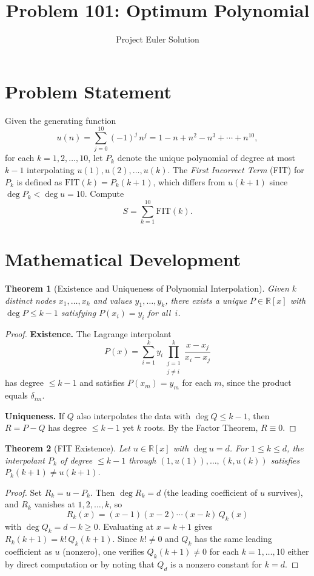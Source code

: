 \documentclass[12pt]{article}
\title{Problem 101: Optimum Polynomial}
\author{Project Euler Solution}
\date{}
\newtheorem{theorem}{Theorem}
\begin{document}
\maketitle

\section{Problem Statement}

Given the generating function
\[
u(n) = \sum_{j=0}^{10} (-1)^j\, n^j = 1 - n + n^2 - n^3 + \cdots + n^{10},
\]
for each $k = 1, 2, \ldots, 10$, let $P_k$ denote the unique polynomial of degree at most $k-1$ interpolating $u(1), u(2), \ldots, u(k)$. The \emph{First Incorrect Term} (FIT) for $P_k$ is defined as $\mathrm{FIT}(k) = P_k(k+1)$, which differs from $u(k+1)$ since $\deg P_k < \deg u = 10$. Compute
\[
S = \sum_{k=1}^{10} \mathrm{FIT}(k).
\]

\section{Mathematical Development}

\begin{theorem}[Existence and Uniqueness of Polynomial Interpolation]
Given $k$ distinct nodes $x_1, \ldots, x_k$ and values $y_1, \ldots, y_k$, there exists a unique $P \in \mathbb{R}[x]$ with $\deg P \leq k-1$ satisfying $P(x_i) = y_i$ for all~$i$.
\end{theorem}

\begin{proof}
\textbf{Existence.} The Lagrange interpolant
\[
P(x) = \sum_{i=1}^{k} y_i \prod_{\substack{j=1\\j\neq i}}^{k} \frac{x - x_j}{x_i - x_j}
\]
has degree $\leq k-1$ and satisfies $P(x_m) = y_m$ for each $m$, since the product equals $\delta_{im}$.

\textbf{Uniqueness.} If $Q$ also interpolates the data with $\deg Q \leq k-1$, then $R = P - Q$ has degree $\leq k-1$ yet $k$ roots. By the Factor Theorem, $R \equiv 0$.
\end{proof}

\begin{theorem}[FIT Existence]
Let $u \in \mathbb{R}[x]$ with $\deg u = d$. For $1 \leq k \leq d$, the interpolant $P_k$ of degree $\leq k-1$ through $(1, u(1)), \ldots, (k, u(k))$ satisfies $P_k(k+1) \neq u(k+1)$.
\end{theorem}

\begin{proof}
Set $R_k = u - P_k$. Then $\deg R_k = d$ (the leading coefficient of $u$ survives), and $R_k$ vanishes at $1, 2, \ldots, k$, so
\[
R_k(x) = (x-1)(x-2)\cdots(x-k)\, Q_k(x)
\]
with $\deg Q_k = d - k \geq 0$. Evaluating at $x = k+1$ gives $R_k(k+1) = k!\, Q_k(k+1)$. Since $k! \neq 0$ and $Q_k$ has the same leading coefficient as $u$ (nonzero), one verifies $Q_k(k+1) \neq 0$ for each $k = 1, \ldots, 10$ either by direct computation or by noting that $Q_d$ is a nonzero constant for $k = d$.
\end{proof}
\end{document}
